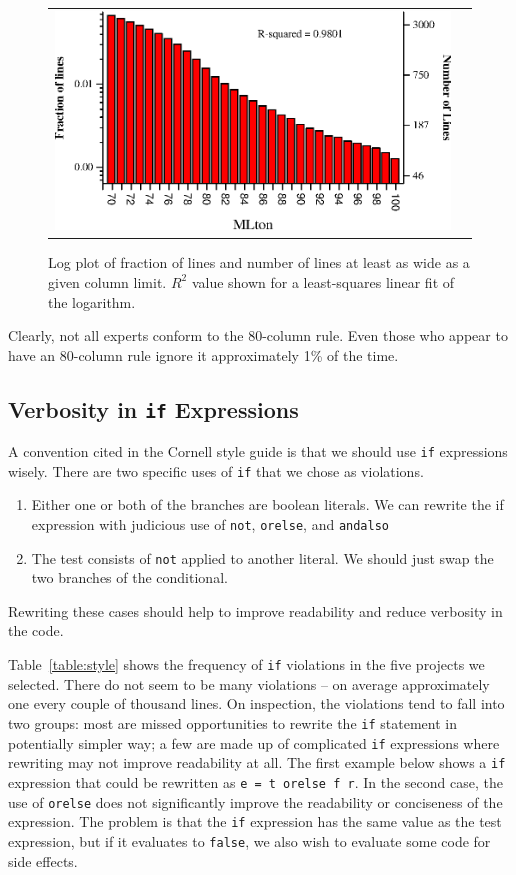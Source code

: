 \documentclass[12pt,abstracton]{scrartcl}
\begin{document}
\begin{figure}[bh!]
\begin{tabular}{cc}
\includegraphics[scale=0.68]{log-mlton.eps} &
\end{tabular}
\caption{Log plot of fraction of lines and number of lines at least as wide as a given column limit. $R^{2}$ value shown for a least-squares linear fit of the logarithm.}
\label{fig:log-width}
\end{figure}

Clearly, not all experts conform to the 80-column rule.
Even those who appear to have an 80-column rule ignore it approximately 1\% of the time.
\subsection{Verbosity in \texttt{if} Expressions}
A convention cited in the Cornell style guide is that we should use \texttt{if}
expressions wisely. There are two specific uses of \texttt{if} that we
chose as violations.
\begin{enumerate}
\item Either one or both of the branches are boolean literals. We can rewrite the if expression with judicious use of \texttt{not}, \texttt{orelse}, and \texttt{andalso}
\item The test consists of \texttt{not} applied to another literal. We should just swap the two branches of the conditional.
\end{enumerate}
Rewriting these cases should help to improve readability and reduce verbosity in the code.

Table~\ref{table:style} shows the frequency of \texttt{if} violations in the five projects we selected.
There do not seem to be many violations -- on average approximately one every couple of thousand lines.
On inspection, the violations tend to fall into two groups: most are
missed opportunities to rewrite the \texttt{if} statement in potentially simpler way;
a few are made up of complicated \texttt{if} expressions where rewriting may not improve readability at all.
The first example below shows a \texttt{if} expression that could be rewritten as \texttt{e = t orelse f r}.
In the second case, the use of \texttt{orelse} does not significantly improve the readability or conciseness
of the expression. The problem is that the \texttt{if} expression has the same value as the test expression,
but if it evaluates to \texttt{false}, we also wish to evaluate some code for side effects.
\end{document}
